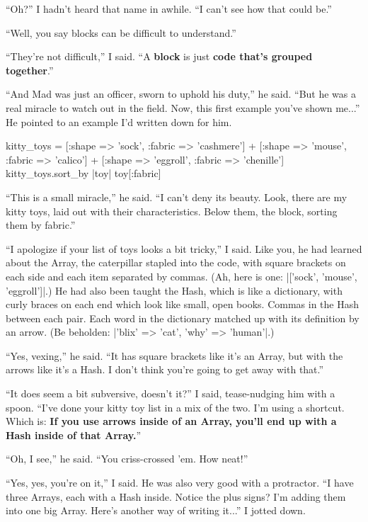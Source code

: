 \documentclass[12pt,twoside]{report}
\begin{document}
``Oh?''  I hadn't heard that name in awhile.  ``I can't see how that
could be.''

``Well, you say blocks can be difficult to understand.''

``They're not difficult,'' I said.  ``A {\bf block} is just {\bf code
  that's grouped together}.''

``And Mad was just an officer, sworn to uphold his duty,'' he said.
``But he was a real miracle to watch out in the field.  Now, this
first example you've shown me...''  He pointed to an example I'd
written down for him.


\begin{rubycode}

 kitty_toys = 
   [:shape => 'sock', :fabric => 'cashmere'] +
   [:shape => 'mouse', :fabric => 'calico'] +
   [:shape => 'eggroll', :fabric => 'chenille'] 
 kitty_toys.sort_by { |toy| toy[:fabric] }

\end{rubycode}


``This is a small miracle,'' he said. ``I can't deny its beauty.
Look, there are my kitty toys, laid out with their characteristics.
Below them, the block, sorting them by fabric.''

``I apologize if your list of toys looks a bit tricky,'' I said.  Like
you, he had learned about the Array, the caterpillar stapled into the
code, with square brackets on each side and each item separated by
commas.  (Ah, here is one: 
\rubyinline|['sock', 'mouse', 'eggroll']|.) 
He had also been taught the Hash, which is like a dictionary, with
curly braces on each end which look like small, open books.  Commas in
the Hash between each pair.  Each word in the dictionary matched up
with its definition by an arrow.  (Be beholden:
\rubyinline|{'blix' => 'cat', 'why' => 'human'}|.)

``Yes, vexing,'' he said.  ``It has square brackets like it's an
Array, but with the arrows like it's a Hash. I don't think you're
going to get away with that.''

``It does seem a bit subversive, doesn't it?''  I said, tease-nudging
him with a spoon.  ``I've done your kitty toy list in a mix of the
two.  I'm using a shortcut.  Which is: {\bf If you use arrows inside
  of an Array, you'll end up with a Hash inside of that Array.}''

``Oh, I see,'' he said.  ``You criss-crossed 'em.  How neat!''

``Yes, yes, you're on it,'' I said.  He was also very good with a
protractor.  ``I have three Arrays, each with a Hash inside.  Notice
the plus signs?  I'm adding them into one big Array.  Here's another
way of writing it...''  I jotted down.
\end{document}
